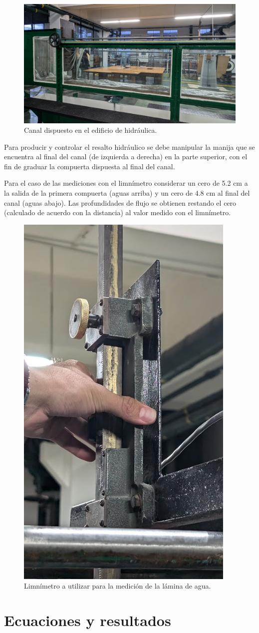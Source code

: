 \documentclass[10pt, a4paper]{exam}
\begin{document}
\begin{figure}[h]
    \centering
    \includegraphics[width=0.75\linewidth]{Images/real.jpg}
    \caption{Canal dispuesto en el edificio de hidráulica.}
    \label{fig:esqreal}
\end{figure}

Para producir y controlar el resalto hidráulico se debe manipular la manija que se encuentra al final del canal (de izquierda a derecha) en la parte superior, con el fin de graduar la compuerta dispuesta al final del canal. \vspace{2ex}

Para el caso de las mediciones con el limnímetro considerar un cero de 5.2 cm a la salida de la primera compuerta (aguas arriba) y un cero de 4.8 cm al final del canal (aguas abajo). Las profundidades de flujo se obtienen restando el cero (calculado de acuerdo con la distancia) al valor medido con el limnímetro.


\newpage

\begin{figure}[h]
    \centering
    \includegraphics[width=0.25\linewidth]{Images/limnimetro.png}
    \caption{Limnímetro a utilizar para la medición de la lámina de agua.}
    \label{}
\end{figure}


\section{Ecuaciones y resultados}
\end{document}

